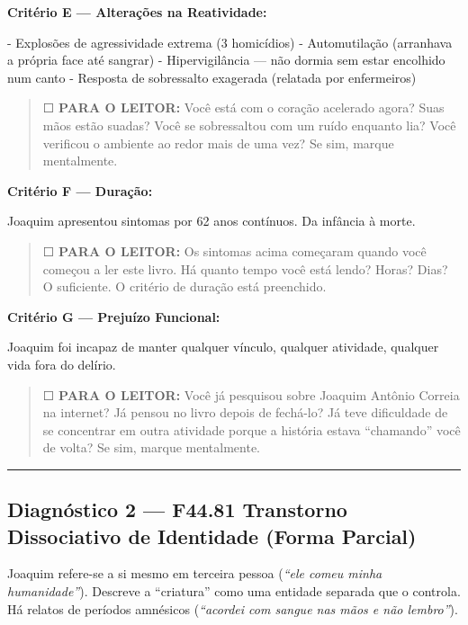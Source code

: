 \noindent \textbf{Critério E --- Alterações na Reatividade:}

\noindent - Explosões de agressividade extrema (3 homicídios)
- Automutilação (arranhava a própria face até sangrar)
- Hipervigilância --- não dormia sem estar encolhido num canto
- Resposta de sobressalto exagerada (relatada por enfermeiros)

\begin{quote}
☐ \textbf{PARA O LEITOR:} Você está com o coração acelerado agora? Suas mãos estão suadas? Você se sobressaltou com um ruído enquanto lia? Você verificou o ambiente ao redor mais de uma vez? Se sim, marque mentalmente.
\end{quote}

\noindent \textbf{Critério F --- Duração:}

\noindent Joaquim apresentou sintomas por 62 anos contínuos. Da infância à morte.

\begin{quote}
☐ \textbf{PARA O LEITOR:} Os sintomas acima começaram quando você começou a ler este livro. Há quanto tempo você está lendo? Horas? Dias? O suficiente. O critério de duração está preenchido.
\end{quote}

\noindent \textbf{Critério G --- Prejuízo Funcional:}

\noindent Joaquim foi incapaz de manter qualquer vínculo, qualquer atividade, qualquer vida fora do delírio.

\begin{quote}
☐ \textbf{PARA O LEITOR:} Você já pesquisou sobre Joaquim Antônio Correia na internet? Já pensou no livro depois de fechá-lo? Já teve dificuldade de se concentrar em outra atividade porque a história estava \textquotedblleft{}chamando\textquotedblright{} você de volta? Se sim, marque mentalmente.
\end{quote}

\vspace{0.5em}\noindent\rule{\textwidth}{0.5pt}\vspace{0.5em}

\subsection*{Diagnóstico 2 --- F44.81 Transtorno Dissociativo de Identidade (Forma Parcial)}

\noindent Joaquim refere-se a si mesmo em terceira pessoa (\textit{\textquotedblleft{}ele comeu minha humanidade\textquotedblright{}}).
Descreve a \textquotedblleft{}criatura\textquotedblright{} como uma entidade separada que o controla.
Há relatos de períodos amnésicos (\textit{\textquotedblleft{}acordei com sangue nas mãos e não lembro\textquotedblright{}}).

